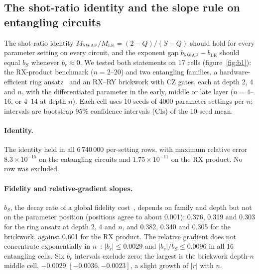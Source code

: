 
\subsection{The shot-ratio identity and the slope rule on entangling circuits}
\label{sec:results-b1}

The shot-ratio identity $M_{\mathrm{SWAP}}/M_{\mathrm{LE}} = (2-Q)/(S-Q)$ should hold for every parameter setting
on every circuit, and the exponent gap $b_{\mathrm{SWAP}} - b_{\mathrm{LE}}$ should equal $b_S$ whenever
$b_r \approx 0$. We tested both statements on 17 cells (figure~\ref{fig:b1}): the RX-product benchmark ($n = 2$--$20$) and two
entangling families, a hardware-efficient ring ansatz~\cite{kandala2017} and an RX--RY brickwork with CZ gates, each at depth 2, 4 and
$n$, with the differentiated parameter in the early, middle or late layer ($n = 4$--$16$, or $4$--$14$ at depth $n$).
Each cell uses 10 seeds of 4000 parameter settings per $n$; intervals are bootstrap 95\% confidence intervals (CIs) of the 10-seed mean.

\paragraph{Identity.} The identity held in all 6\,740\,000 per-setting rows, with maximum relative error
$8.3\times10^{-15}$ on the entangling circuits and $1.75\times10^{-11}$ on the RX product. No row was excluded.

\paragraph{Fidelity and relative-gradient slopes.} $b_S$, the decay rate of a global fidelity cost~\cite{cerezo2021},
depends on family and depth but not on the parameter
position (positions agree to about 0.001): 0.376, 0.319 and 0.303 for the ring ansatz at depth 2, 4 and $n$, and
0.382, 0.340 and 0.305 for the brickwork, against 0.601 for the RX product. The relative gradient does not
concentrate exponentially in $n$~\cite{mcclean2018,larocca2025}: $|b_r| \le 0.0029$ and $|b_r|/b_S \le 0.0096$ in all 16 entangling cells. Six $b_r$ intervals exclude
zero; the largest is the brickwork depth-$n$ middle cell, $-0.0029$ $[-0.0036, -0.0023]$, a slight growth of $|r|$
with $n$.

